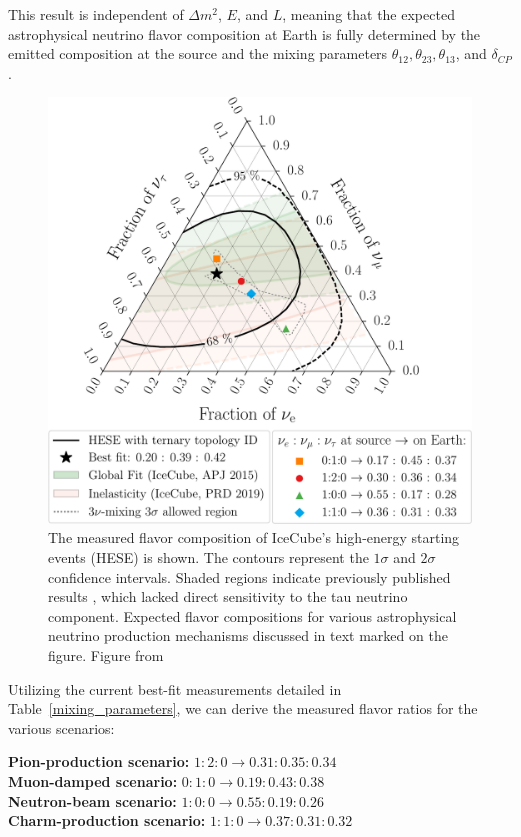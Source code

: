 This result is independent of $\Delta m^2$, $E$, and $L$, meaning that the expected astrophysical neutrino flavor composition at Earth is fully determined by the emitted composition at the source and the mixing parameters $\theta_{12}, \theta_{23}, \theta_{13}$, and $\delta_{CP}$.
\begin{figure}[h]
    \caption{The measured flavor composition of IceCube's high-energy starting events (HESE) is shown. The contours represent the $1\sigma$ and $2\sigma$ confidence intervals. Shaded regions indicate previously published results \cite{lars_globalfit,gary_paper}, which lacked direct sensitivity to the tau neutrino component. Expected flavor compositions for various astrophysical neutrino production mechanisms discussed in text marked on the figure. Figure from \cite{Juliana_paper}}
    \includegraphics{./figures/nu_he/flavor_scan_7yr_steps21_inel_gf_source_shaded_serif_paper.pdf}
\end{figure}
Utilizing the current best-fit measurements detailed in Table~\ref{mixing_parameters}, we can derive the measured flavor ratios for the various scenarios:

\begin{kaobox}
\centering
\textbf{Pion-production scenario:} $1 : 2 : 0 \rightarrow 0.31 : 0.35 : 0.34$\\ 
\textbf{Muon-damped scenario:} $0 : 1 : 0 \rightarrow 0.19 : 0.43 : 0.38$\\ 
\textbf{Neutron-beam scenario:} $1 : 0 : 0 \rightarrow 0.55 : 0.19 : 0.26 $\\
\textbf{Charm-production scenario:} $1 : 1 : 0 \rightarrow 0.37 : 0.31 : 0.32$\\
\end{kaobox}

